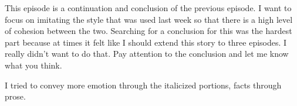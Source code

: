 This episode is a continuation and conclusion of the previous episode. I want to focus on imitating the style that was used last week so that there is a high level of cohesion between the two. Searching for a conclusion for this was the hardest part because at times it felt like I should extend this story to three episodes. I really didn't want to do that. Pay attention to the conclusion and let me know what you think.

I tried to convey more emotion through the italicized portions, facts through prose.

